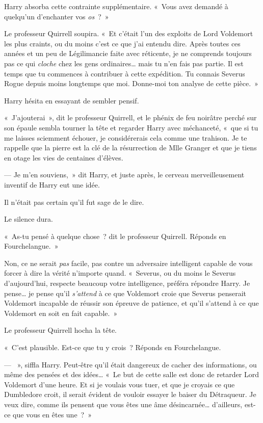 Harry absorba cette contrainte supplémentaire. «~Vous avez demandé à quelqu'un d'enchanter vos \emph{os}~?~»

Le professeur Quirrell soupira. «~Et c'était l'un des exploits de Lord Voldemort les plus craints, ou du moins c'est ce que j'ai entendu dire. Après toutes ces années et un peu de Légilimancie faite avec réticente, je ne comprends toujours pas ce qui \emph{cloche} chez les gens ordinaires… mais tu n'en fais pas partie. Il est temps que tu commences à contribuer à cette expédition. Tu connais Severus Rogue depuis moins longtemps que moi. Donne-moi ton analyse de cette pièce.~»

Harry hésita en essayant de sembler pensif.

«~J'ajouterai~», dit le professeur Quirrell, et le phénix de feu noirâtre perché sur son épaule sembla tourner la tête et regarder Harry avec méchanceté, «~que si tu me laisses sciemment échouer, je considérerais cela comme une trahison. Je te rappelle que la pierre est la clé de la résurrection de Mlle Granger et que je tiens en otage les vies de centaines d'élèves.

--- Je m'en souviens,~» dit Harry, et juste après, le cerveau merveilleusement inventif de Harry eut une idée.

Il n'était pas certain qu'il fut sage de le dire.

Le silence dura.

«~As-tu pensé à quelque chose~? dit le professeur Quirrell. Réponds en Fourchelangue.~»

Non, ce ne serait \emph{pas} facile, pas contre un adversaire intelligent capable de vous forcer à dire la vérité n'importe quand. «~Severus, ou du moins le Severus d'aujourd'hui, respecte beaucoup votre intelligence, préféra répondre Harry. Je pense… je pense qu'il \emph{s'attend} à ce que Voldemort croie que Severus penserait Voldemort incapable de réussir son épreuve de patience, et qu'il s'attend à ce que Voldemort en soit en fait capable.~»

Le professeur Quirrell hocha la tête.

«~C'est plausible. Est-ce que tu y crois~? Réponds en Fourchelangue.

--- ~», siffla Harry. Peut-être qu'il était dangereux de cacher des informations, ou même des pensées et des idées… «~Le but de cette salle est donc de retarder Lord Voldemort d'une heure. Et si je voulais vous tuer, et que je croyais ce que Dumbledore croit, il serait évident de vouloir essayer le baiser du Détraqueur. Je veux dire, comme ils pensent que vous êtes une âme désincarnée… d'ailleurs, est-ce que vous en êtes une~?~»

